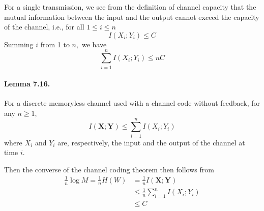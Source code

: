 \documentclass[8pt]{article}
\begin{document}
For a single transmission, we see from the definition of channel capacity that the mutual information between the input and the output cannot exceed the capacity of the channel, i.e., for all $1 \leq i \leq n$
$$
I\left(X_{i} ; Y_{i}\right) \leq C
$$
Summing $i$ from 1 to $n,$ we have
$$
\sum_{i=1}^{n} I\left(X_{i} ; Y_{i}\right) \leq n C
$$
\begin{tcolorbox}
	\paragraph{Lemma 7.16.} For a discrete memoryless channel used with a channel code without feedback, for any $n \geq 1$,
	$$
	I(\mathbf{X} ; \mathbf{Y}) \leq \sum_{i=1}^{n} I\left(X_{i} ; Y_{i}\right)
	$$
	where $X_{i}$ and $Y_{i}$ are, respectively, the input and the output of the channel at time $i$.
\end{tcolorbox}
Then the converse of the channel coding theorem then follows from
$$
\begin{aligned}
\frac{1}{n} \log M =\frac{1}{n} H(W) 
&=\frac{1}{n} I(\mathbf{X} ; \mathbf{Y}) \\
& \leq \frac{1}{n} \sum_{i=1}^{n} I\left(X_{i} ; Y_{i}\right) \\
& \leq C
\end{aligned}
$$
\end{document}
